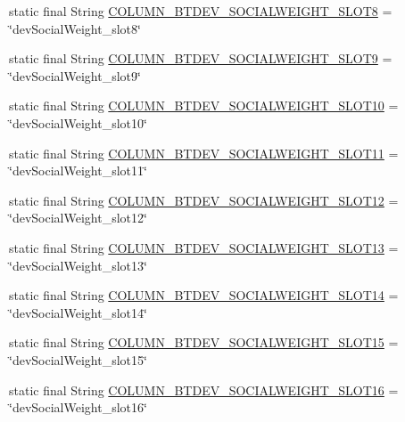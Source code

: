 \begin{DoxyCompactItemize}
static final String \hyperlink{classcs_1_1nsense_1_1db_1_1_n_sense_s_q_lite_helper_a168a795573ef5c7bb454fdd111ba33bc}{C\-O\-L\-U\-M\-N\-\_\-\-B\-T\-D\-E\-V\-\_\-\-S\-O\-C\-I\-A\-L\-W\-E\-I\-G\-H\-T\-\_\-\-S\-L\-O\-T8} = \char`\"{}dev\-Social\-Weight\-\_\-slot8\char`\"{}
\item 
static final String \hyperlink{classcs_1_1nsense_1_1db_1_1_n_sense_s_q_lite_helper_adc42fbf682a0fb1e2ea2157e3bf019b4}{C\-O\-L\-U\-M\-N\-\_\-\-B\-T\-D\-E\-V\-\_\-\-S\-O\-C\-I\-A\-L\-W\-E\-I\-G\-H\-T\-\_\-\-S\-L\-O\-T9} = \char`\"{}dev\-Social\-Weight\-\_\-slot9\char`\"{}
\item 
static final String \hyperlink{classcs_1_1nsense_1_1db_1_1_n_sense_s_q_lite_helper_aede34e6a126ed327009cd2811f24b4a4}{C\-O\-L\-U\-M\-N\-\_\-\-B\-T\-D\-E\-V\-\_\-\-S\-O\-C\-I\-A\-L\-W\-E\-I\-G\-H\-T\-\_\-\-S\-L\-O\-T10} = \char`\"{}dev\-Social\-Weight\-\_\-slot10\char`\"{}
\item 
static final String \hyperlink{classcs_1_1nsense_1_1db_1_1_n_sense_s_q_lite_helper_a15720b6758996b12d01098b5c69a5cf1}{C\-O\-L\-U\-M\-N\-\_\-\-B\-T\-D\-E\-V\-\_\-\-S\-O\-C\-I\-A\-L\-W\-E\-I\-G\-H\-T\-\_\-\-S\-L\-O\-T11} = \char`\"{}dev\-Social\-Weight\-\_\-slot11\char`\"{}
\item 
static final String \hyperlink{classcs_1_1nsense_1_1db_1_1_n_sense_s_q_lite_helper_a77faece94b4e52583a43ecae43490ba3}{C\-O\-L\-U\-M\-N\-\_\-\-B\-T\-D\-E\-V\-\_\-\-S\-O\-C\-I\-A\-L\-W\-E\-I\-G\-H\-T\-\_\-\-S\-L\-O\-T12} = \char`\"{}dev\-Social\-Weight\-\_\-slot12\char`\"{}
\item 
static final String \hyperlink{classcs_1_1nsense_1_1db_1_1_n_sense_s_q_lite_helper_a9f6a0352030105ea7c51243b9f20d2af}{C\-O\-L\-U\-M\-N\-\_\-\-B\-T\-D\-E\-V\-\_\-\-S\-O\-C\-I\-A\-L\-W\-E\-I\-G\-H\-T\-\_\-\-S\-L\-O\-T13} = \char`\"{}dev\-Social\-Weight\-\_\-slot13\char`\"{}
\item 
static final String \hyperlink{classcs_1_1nsense_1_1db_1_1_n_sense_s_q_lite_helper_af5dccc4390220fd85b4e79bbca7c2879}{C\-O\-L\-U\-M\-N\-\_\-\-B\-T\-D\-E\-V\-\_\-\-S\-O\-C\-I\-A\-L\-W\-E\-I\-G\-H\-T\-\_\-\-S\-L\-O\-T14} = \char`\"{}dev\-Social\-Weight\-\_\-slot14\char`\"{}
\item 
static final String \hyperlink{classcs_1_1nsense_1_1db_1_1_n_sense_s_q_lite_helper_aa68b0c0c8363dd4ac743e8032962fb61}{C\-O\-L\-U\-M\-N\-\_\-\-B\-T\-D\-E\-V\-\_\-\-S\-O\-C\-I\-A\-L\-W\-E\-I\-G\-H\-T\-\_\-\-S\-L\-O\-T15} = \char`\"{}dev\-Social\-Weight\-\_\-slot15\char`\"{}
\item 
static final String \hyperlink{classcs_1_1nsense_1_1db_1_1_n_sense_s_q_lite_helper_abee33f90ba813221b66b297fd29ee0b3}{C\-O\-L\-U\-M\-N\-\_\-\-B\-T\-D\-E\-V\-\_\-\-S\-O\-C\-I\-A\-L\-W\-E\-I\-G\-H\-T\-\_\-\-S\-L\-O\-T16} = \char`\"{}dev\-Social\-Weight\-\_\-slot16\char`\"{}

\end{DoxyCompactItemize}
